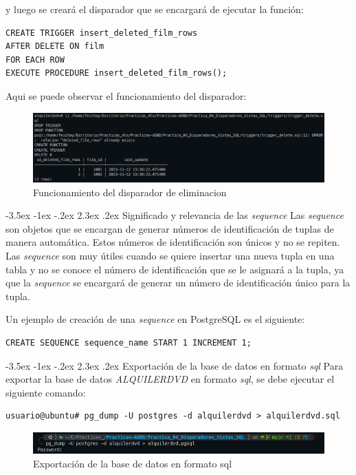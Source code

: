 \documentclass{report}
\makeatletter
\renewcommand\chapter{\@startsection{chapter}{0}{\z@}%
    {-3.5ex \@plus -1ex \@minus -.2ex}%
    {2.3ex \@plus.2ex}%
    {\normalfont\Large\bfseries}}
\makeatother
\begin{document}
y luego se creará el disparador que se encargará de ejecutar la función:
\begin{verbatim}
CREATE TRIGGER insert_deleted_film_rows
AFTER DELETE ON film
FOR EACH ROW
EXECUTE PROCEDURE insert_deleted_film_rows();
\end{verbatim}

Aqui se puede observar el funcionamiento del disparador:
\begin{figure}[H]
  \centering
  \includegraphics[scale=0.36]{img/delete_trigger.png}
  \caption{Funcionamiento del disparador de eliminacion}
  \label{fig:funcionamiento del disparador de eliminacion}
\end{figure}

\cleardoublepage

\chapter{Significado y relevancia de las \emph{sequence}}
Las \emph{sequence} son objetos que se encargan de generar números de identificación de tuplas de manera automática.
Estos números de identificación son únicos y no se repiten. Las \emph{sequence} son muy útiles cuando se quiere
insertar una nueva tupla en una tabla y no se conoce el número de identificación que se le asignará a la tupla, ya
que la \emph{sequence} se encargará de generar un número de identificación único para la tupla.

Un ejemplo de creación de una \emph{sequence} en PostgreSQL es el siguiente:
\begin{verbatim}
CREATE SEQUENCE sequence_name START 1 INCREMENT 1;
\end{verbatim}


\chapter{Exportación de la base de datos en formato \emph{sql}}
Para exportar la base de datos \emph{ALQUILERDVD} en formato \emph{sql}, se debe ejecutar el siguiente comando:
\begin{verbatim}
usuario@ubuntu# pg_dump -U postgres -d alquilerdvd > alquilerdvd.sql
\end{verbatim}

\begin{figure}[H]
  \centering
  \includegraphics[scale=0.55]{img/export_db.png}
  \caption{Exportación de la base de datos en formato sql}
  \label{fig:exportación de la base de datos en formato sql}
\end{figure}
\end{document}
